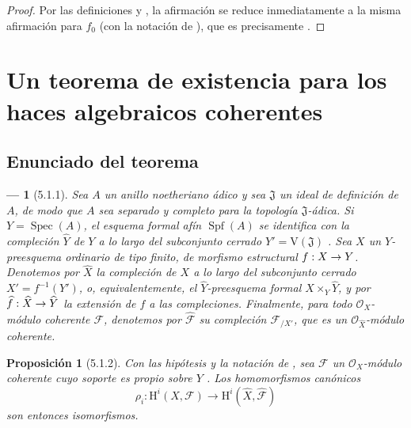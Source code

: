 \documentclass[10pt,oneside,openany]{book}
\theoremstyle{egaenv}\newtheorem*{env}{---}
\theoremstyle{egastatement}
\newtheorem*{proposition}{Proposición}
\theoremstyle{egadescription}
\renewcommand{\to}{\mathchoice{\longrightarrow}{\rightarrow}{\rightarrow}{\rightarrow}}
\begin{document}
\begin{proof}
Por las definiciones  y , la
afirmación se reduce inmediatamente a la misma afirmación para $f_0$
(con la notación de ), que es precisamente
.
\end{proof}



\section{Un teorema de existencia para los haces algebraicos coherentes}
\label{section:III.5}
\label{section:III.5-fr}


\subsection{Enunciado del teorema}
\label{subsection:III.5.1}
\label{subsection:III.5.1-fr}

\begin{env}[5.1.1]
\label{III.5.1.1}
\label{III.5.1.1-fr}
Sea $A$ un anillo \emph{noetheriano ádico} y sea $\mathfrak J$ un ideal de
definición de $A$, de modo que $A$ sea separado y completo para la
topología $\mathfrak J$-ádica. Si $Y=\operatorname{Spec}(A)$, el esquema formal
afín $\operatorname{Spf}(A)$ se identifica con la \emph{compleción}
$\widehat Y$ de $Y$ a lo largo del subconjunto cerrado
$Y'=\mathrm V(\mathfrak J)$ . Sea $X$ un
$Y$-preesquema ordinario de tipo finito, de morfismo estructural
$f:X\to Y$. Denotemos por $\widehat X$ la \emph{compleción} de $X$ a lo largo
del subconjunto cerrado $X'=f^{-1}(Y')$, o, equivalentemente, el
$\widehat Y$-preesquema formal $X\times_Y\widehat Y$, y por
$\widehat f:\widehat X\to\widehat Y$ la extensión de $f$ a las
compleciones. Finalmente, para todo $\mathcal O_X$-módulo coherente
$\mathcal F$, denotemos por $\widehat{\mathcal F}$ su compleción
$\mathcal F_{/X'}$, que es un
$\mathcal O_{\widehat X}$-módulo coherente.
\end{env}

\begin{proposition}[5.1.2]
\label{III.5.1.2}
\label{III.5.1.2-fr}
Con las hipótesis y la notación de , sea $\mathcal F$
un $\mathcal O_X$-módulo coherente cuyo soporte es propio sobre $Y$
. Los homomorfismos canónicos
\[
\rho_i:\mathrm H^i(X,\mathcal F)\longrightarrow
\mathrm H^i(\widehat X,\widehat{\mathcal F})
\]
son entonces isomorfismos.
\end{proposition}
\end{document}
